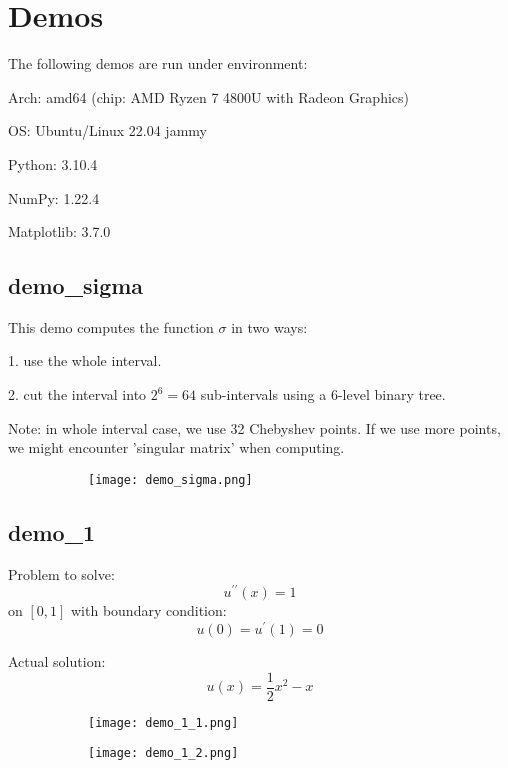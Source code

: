 \documentclass{article}
\begin{document}
\section{Demos}

The following demos are run under environment:
\bigskip

Arch: amd64 (chip: AMD Ryzen 7 4800U with Radeon Graphics)

OS: Ubuntu/Linux 22.04 jammy

Python: 3.10.4

NumPy: 1.22.4

Matplotlib: 3.7.0

\subsection{demo\_sigma}

This demo computes the function $\sigma$ in two ways: 

1. use the whole interval.

2. cut the interval into $2^6 = 64$ sub-intervals using a 6-level binary tree.

Note: in whole interval case, we use 32 Chebyshev points. 
If we use more points, we might encounter 'singular matrix' when computing.

\begin{figure}[H]
	\centering
    \begin{subfigure}[h]{0.8\linewidth}
	    \texttt{[image: demo\_sigma.png]}
    \end{subfigure}
\end{figure}

\subsection{demo\_1}

Problem to solve:
$$
    u^{\prime\prime}(x) = 1
$$ on $[0, 1]$
with boundary condition:
$$
    u(0) = u^\prime(1) = 0
$$

Actual solution:
$$
    u(x) = \frac12 x^2 - x
$$

\begin{figure}[H]
	\centering
	\begin{subfigure}[h]{0.45\linewidth}
	    \texttt{[image: demo\_1\_1.png]}
    \end{subfigure}
    \begin{subfigure}[h]{0.45\linewidth}
	    \texttt{[image: demo\_1\_2.png]}
    \end{subfigure}
\end{figure}
\end{document}
